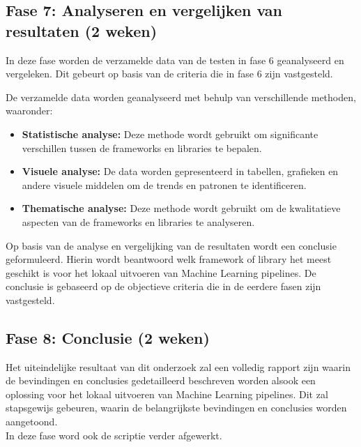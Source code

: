 \subsection{Fase 7: Analyseren en vergelijken van resultaten (2 weken)}
In deze fase worden de verzamelde data van de testen in fase 6 geanalyseerd en vergeleken. Dit gebeurt op basis van de criteria die in fase 6 zijn vastgesteld.

De verzamelde data worden geanalyseerd met behulp van verschillende methoden, waaronder:
\begin{itemize}
  \item \textbf{Statistische analyse:} Deze methode wordt gebruikt om significante verschillen tussen de frameworks en libraries te bepalen.
  \item \textbf{Visuele analyse:} De data worden gepresenteerd in tabellen, grafieken en andere visuele middelen om de trends en patronen te identificeren.
  \item \textbf{Thematische analyse:}  Deze methode wordt gebruikt om de kwalitatieve aspecten van de frameworks en libraries te analyseren.
\end{itemize}

Op basis van de analyse en vergelijking van de resultaten wordt een conclusie geformuleerd. Hierin wordt beantwoord welk framework of library het meest geschikt is voor het lokaal uitvoeren van Machine Learning pipelines. De conclusie is gebaseerd op de objectieve criteria die in de eerdere fasen zijn vastgesteld.
\subsection{Fase 8: Conclusie (2 weken)}
Het uiteindelijke resultaat van dit onderzoek zal een volledig rapport zijn waarin de bevindingen en conclusies gedetailleerd beschreven worden alsook een oplossing voor het lokaal uitvoeren van Machine Learning pipelines. Dit zal stapsgewijs gebeuren, waarin de belangrijkste bevindingen en conclusies worden aangetoond.\\
In deze fase word ook de scriptie verder afgewerkt.

